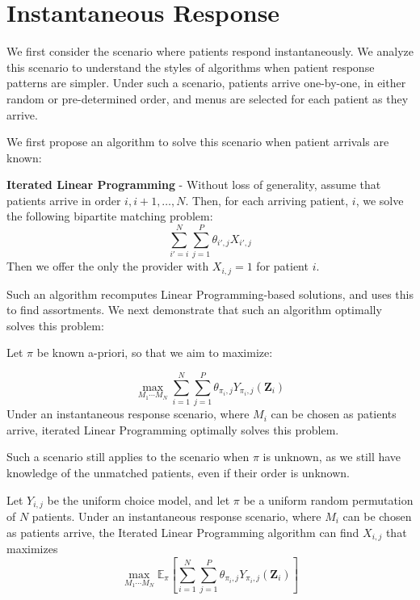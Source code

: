 \section{Instantaneous Response}
We first consider the scenario where patients respond instantaneously. 
We analyze this scenario to understand the styles of algorithms when patient response patterns are simpler. 
Under such a scenario, patients arrive one-by-one, in either random or pre-determined order, and menus are selected for each patient as they arrive. 

We first propose an algorithm to solve this scenario when patient arrivals are known: 
\begin{definition}
    \textbf{Iterated Linear Programming} - Without loss of generality, assume that patients arrive in order $i,i+1,\ldots,N$. Then, for each arriving patient, $i$, we solve the following bipartite matching problem: 
    \begin{equation}
        \sum_{i'=i}^{N} \sum_{j=1}^{P} \theta_{i',j} X_{i',j}
    \end{equation}
    Then we offer the only the provider with $X_{i,j} = 1$ for patient $i$. 
\end{definition}

Such an algorithm recomputes Linear Programming-based solutions, and uses this to find assortments. 
We next demonstrate that such an algorithm optimally solves this problem:
\begin{lemma}
    Let $\pi$ be known a-priori, so that we aim to maximize: 

    \begin{equation}
        \max_{M_{1} \cdots M_{N}} \sum_{i=1}^{N} \sum_{j=1}^{P} \theta_{\pi_{i},j} Y_{\pi_{i},j}(\mathbf{Z}_{i})
    \end{equation}
    Under an instantaneous response scenario, where $M_{i}$ can be chosen as patients arrive, iterated Linear Programming optimally solves this problem. 
\end{lemma}

Such a scenario still applies to the scenario when $\pi$ is unknown, as we still have knowledge of the unmatched patients, even if their order is unknown. 

\begin{lemma}
    Let $Y_{i,j}$ be the uniform choice model, and let $\pi$ be a uniform random permutation of $N$ patients. 
    Under an instantaneous response scenario, where $M_{i}$ can be chosen as patients arrive, the Iterated Linear Programming algorithm can find $X_{i,j}$ that maximizes 
    \begin{equation}
        \max_{M_{1} \cdots M_{N}} \mathbb{E}_{\pi}[\sum_{i=1}^{N} \sum_{j=1}^{P} \theta_{\pi_{i},j} Y_{\pi_{i},j}(\mathbf{Z}_{i})]
    \end{equation}
\end{lemma}
